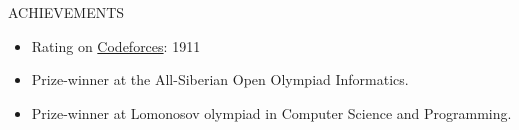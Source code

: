 \documentclass{resume}
\begin{document}
\begin{ResumeSection}{ACHIEVEMENTS}
    \begin{itemize}
        \item Rating on \href{https://codeforces.com/profile/nikita4109}{Codeforces}: 1911
        \item Prize-winner at the All-Siberian Open Olympiad Informatics. 
        \item Prize-winner at Lomonosov olympiad in Computer Science and Programming.
    \end{itemize}
\end{ResumeSection}
\end{document}
